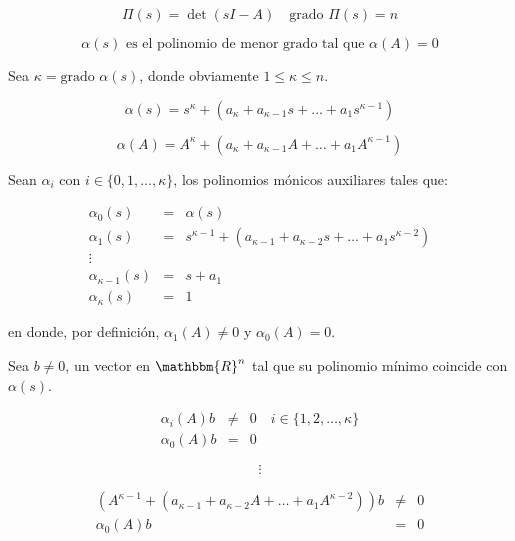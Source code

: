 \begin{equation}
\Pi(s) = \det{(sI - A)} \quad \text{grado } \Pi(s) = n \nonumber
\end{equation}

\begin{equation}
\alpha(s) \text{ es el polinomio de menor grado tal que } \alpha(A) = 0 \nonumber
\end{equation}

Sea $\kappa = \text{grado } \alpha(s)$, donde obviamente $1 \le \kappa \le n$.

\begin{equation}
\alpha(s) = s^{\kappa} + (a_{\kappa} + a_{\kappa - 1} s + \dots + a_1 s^{\kappa - 1}) \nonumber
\end{equation}

\begin{equation}
\alpha(A) = A^{\kappa} + (a_{\kappa} + a_{\kappa - 1} A + \dots + a_1 A^{\kappa - 1}) \nonumber
\end{equation}

Sean $\alpha_i$ con $i \in \{ 0, 1, \dots, \kappa \}$, los polinomios mónicos auxiliares tales que:

\begin{eqnarray}
\alpha_0(s) & = & \alpha(s) \nonumber \\
\alpha_1(s) & = & s^{\kappa - 1} + (a_{\kappa - 1} + a_{\kappa - 2} s + \dots + a_1 s^{\kappa - 2}) \nonumber \\
\vdots \nonumber \\
\alpha_{\kappa - 1}(s) & = & s + a_1 \nonumber \\
\alpha_{\kappa}(s) & = & 1 \nonumber
\end{eqnarray}

en donde, por definición, $\alpha_1(A) \ne 0$ y $\alpha_0(A) = 0$.

Sea $b \ne 0$, un vector en $\mathbbm{R}^n$ tal que su polinomio mínimo coincide con $\alpha(s)$.

\begin{eqnarray}
\alpha_i(A) b & \ne & 0 \quad i \in \{ 1, 2, \dots, \kappa \} \nonumber \\
\alpha_0(A) b & = & 0 \nonumber
\end{eqnarray}

\begin{equation}
\vdots \nonumber
\end{equation}

\begin{eqnarray}
(A^{\kappa - 1} + (a_{\kappa - 1} + a_{\kappa - 2} A + \dots + a_1 A^{\kappa - 2})) b & \ne & 0 \nonumber \\
\alpha_0(A) b & = & 0 \nonumber
\end{eqnarray}


